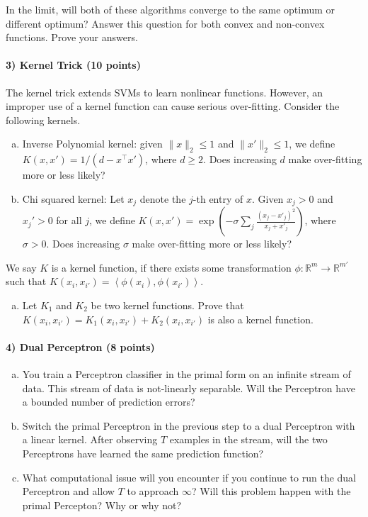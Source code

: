 \documentclass{article}
\begin{document}
In the limit, will both of these algorithms converge to the same optimum or different optimum? Answer this question for both convex and non-convex functions. Prove your answers.

\paragraph{3) Kernel Trick (10 points)}
The kernel trick extends SVMs to learn nonlinear functions. However, an improper use of a kernel function can cause serious over-fitting. Consider the following kernels.
\begin{enumerate}[(a)]
	\item Inverse Polynomial kernel: given $\|x\|_2\leq 1$ and $\|x'\|_2\leq 1$, we define $K(x, x') = 1/(d-x^\top x')$, where $d\geq 2$. Does increasing $d$ make over-fitting more or less likely?

	\item Chi squared kernel: Let $x_j$ denote the $j$-th entry of $x$. Given $x_j>0$ and $x_j'>0$ for all $j$, we define $K(x, x') = \exp\left(-\sigma\sum_j\frac{(x_j-x'_j)^2}{x_j+x'_j}\right)$, where $\sigma>0$. Does increasing $\sigma$ make over-fitting more or less likely?

\end{enumerate}
We say $K$ is a kernel function, if there exists some transformation $\phi:\mathbb{R}^m\rightarrow \mathbb{R}^{m'}$ such that $K(x_i,x_{i'}) = \left<\phi(x_i),\phi(x_{i'})\right>$.
\begin{enumerate}[(c)]
	\item Let $K_1$ and $K_2$ be two kernel functions. Prove that $K(x_i,x_{i'}) = K_1(x_i,x_{i'}) + K_2(x_i,x_{i'})$ is also a kernel function.
\end{enumerate}

\paragraph{4) Dual Perceptron (8 points)} 
\begin{enumerate}[(c)]
	\item You train a Perceptron classifier in the primal form on an infinite stream of data. This stream of data is not-linearly separable. Will the Perceptron have a bounded number of prediction errors?
	\item Switch the primal Perceptron in the previous step to a dual Perceptron with a linear kernel. After observing $T$ examples in the stream, will the two Perceptrons have learned the same prediction function?
	\item What computational issue will you encounter if you continue to run the dual Perceptron and allow $T$ to approach $\infty$? Will this problem happen with the primal Percepton? Why or why not?
\end{enumerate}
\end{document}

